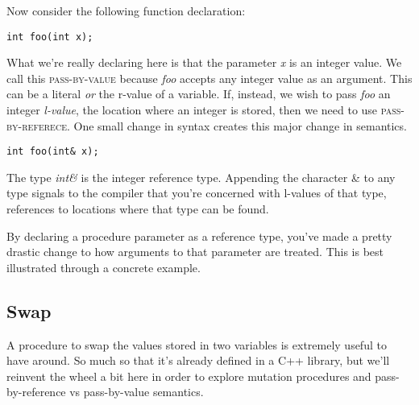 \documentclass[nobib]{tufte-handout}
\begin{document}
Now consider the following function declaration:
\begin{verbatim}
int foo(int x);
\end{verbatim} 
What we're really declaring here is that the parameter \textit{x} is an integer value. We call this \textsc{pass-by-value} because \textit{foo} accepts any integer value as an argument. This can be a literal \textit{or} the r-value of a variable. If, instead, we wish to pass \textit{foo} an integer \textit{l-value}, the location where an integer is stored, then we need to use \textsc{pass-by-referece}. One small change in syntax creates this major change in semantics.
\begin{verbatim}
int foo(int& x);
\end{verbatim}
The type \textit{int\&} is the integer reference type. Appending the character \& to any type signals to the compiler that you're concerned with l-values of that type, references to locations where that type can be found. 

By declaring a procedure parameter as a reference type, you've made a pretty drastic change to how arguments to that parameter are treated.  This is best illustrated through a concrete example.

\subsection{Swap}

A procedure to swap the values stored in two variables is extremely useful to have around. So much so that it's already defined in a C++ library, but we'll reinvent the wheel a bit here in order to explore mutation procedures and pass-by-reference vs pass-by-value semantics. 
\end{document}
